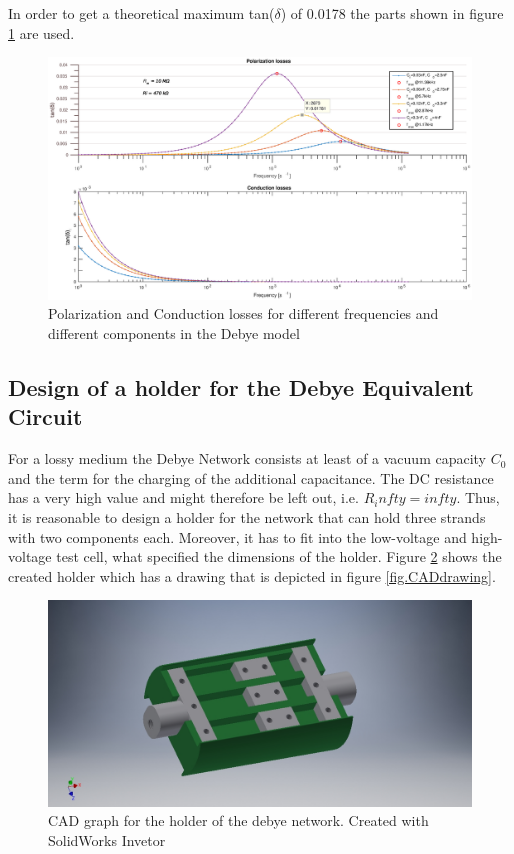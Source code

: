 In order to get a theoretical maximum tan($\delta$) of 0.0178 the parts shown in figure \ref{fig.debye-modell} are used. 
\begin{figure}
	\includegraphics[width=\textwidth]{figures/Method/Dielectric_loss/polarizationmultiple.eps}	
	\caption{Polarization and Conduction losses for different frequencies and different components in the Debye model }	
	\label{fig.debye-modell}
\end{figure}

\subsection{Design of a holder for the Debye Equivalent Circuit}
For a lossy medium the Debye Network consists at least of a vacuum capacity $C_0$ and the term for the charging of the additional capacitance. The DC resistance has a very high value and might therefore be left out, i.e. $R_infty=infty$. Thus, it is reasonable to design a holder for the network that can hold three strands with two components each. Moreover, it has to fit into the low-voltage and high-voltage test cell, what specified the dimensions of the holder.  
Figure \ref{fig.CADgraph} shows the created holder which has a drawing that is depicted in figure \ref{fig.CADdrawing}.

\begin{figure}
\includegraphics[width=\textwidth]{figures/Method/CAD_MODEL/Gesamtanordnung.jpg}
\caption{CAD graph for the holder of the debye network. Created with SolidWorks Invetor}
\label{fig.CADgraph}
\end{figure}
\newpage

